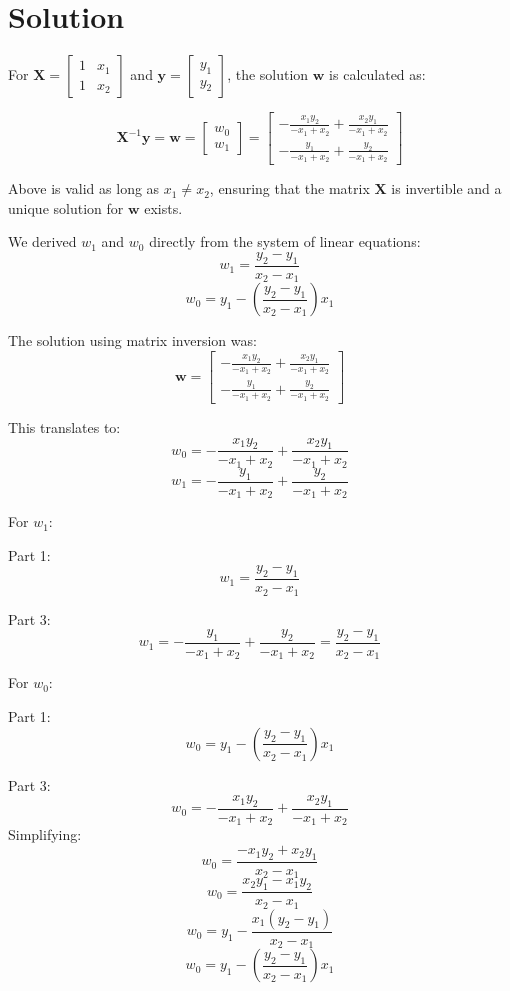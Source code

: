 \documentclass{harvardml}
\theoremstyle{definition}
\theoremstyle{plain}
\newenvironment{solution}
  {\color{blue}\section*{Solution}}
{}
\begin{document}
\begin{solution}
For \(\mathbf{X} = \begin{bmatrix} 1 & x_1 \\ 1 & x_2 \end{bmatrix}\) and \(\mathbf{y} = \begin{bmatrix} y_1 \\ y_2 \end{bmatrix}\), the solution \(\mathbf{w}\) is calculated as:

\[
\mathbf{X}^{-1}\mathbf{y} = \mathbf{w} = \begin{bmatrix} w_0 \\ w_1 \end{bmatrix} = \begin{bmatrix} -\frac{x_1 y_2}{-x_1 + x_2} + \frac{x_2 y_1}{-x_1 + x_2} \\ -\frac{y_1}{-x_1 + x_2} + \frac{y_2}{-x_1 + x_2} \end{bmatrix}
\]

Above is valid as long as \(x_1 \neq x_2\), ensuring that the matrix \(\mathbf{X}\) is invertible and a unique solution for \(\mathbf{w}\) exists.

\bigskip
\bigskip
We derived \(w_1\) and \(w_0\) directly from the system of linear equations:
     \[ w_1 = \frac{y_2 - y_1}{x_2 - x_1} \]
     \[ w_0 = y_1 - \left(\frac{y_2 - y_1}{x_2 - x_1}\right) x_1 \]

The solution using matrix inversion was:
     \[ \mathbf{w} = \begin{bmatrix} -\frac{x_1 y_2}{-x_1 + x_2} + \frac{x_2 y_1}{-x_1 + x_2} \\ -\frac{y_1}{-x_1 + x_2} + \frac{y_2}{-x_1 + x_2} \end{bmatrix} \]

This translates to:
\[ w_0 = -\frac{x_1 y_2}{-x_1 + x_2} + \frac{x_2 y_1}{-x_1 + x_2} \]
\[ w_1 = -\frac{y_1}{-x_1 + x_2} + \frac{y_2}{-x_1 + x_2} \]

For \(w_1\):

Part 1: \[w_1 = \frac{y_2 - y_1}{x_2 - x_1}\]

Part 3: \[w_1 = -\frac{y_1}{-x_1 + x_2} + \frac{y_2}{-x_1 + x_2} = \frac{y_2 - y_1}{x_2 - x_1}\]


For \(w_0\):

Part 1: \[w_0 = y_1 - \left(\frac{y_2 - y_1}{x_2 - x_1}\right) x_1\]

Part 3: \[w_0 = -\frac{x_1 y_2}{-x_1 + x_2} + \frac{x_2 y_1}{-x_1 + x_2}\] 
Simplifying:
    \[ w_0 = \frac{-x_1 y_2 + x_2 y_1}{x_2 - x_1} \]
    \[ w_0 = \frac{x_2 y_1 - x_1 y_2}{x_2 - x_1} \]
    \[ w_0 = y_1 - \frac{x_1(y_2 - y_1)}{x_2 - x_1} \]
    \[ w_0 = y_1 - \left(\frac{y_2 - y_1}{x_2 - x_1}\right) x_1 \]
\medskip



\end{solution}
\end{document}
